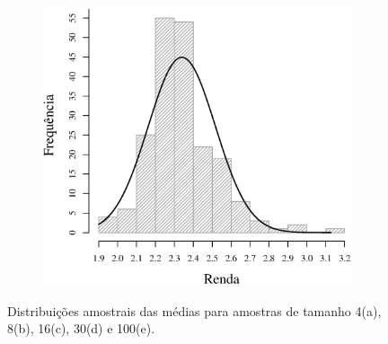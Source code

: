 \begin{figure}
\begin{subfigure}[b]{0.48\textwidth}
		\caption{}
		\label{fig:m30}
	\end{subfigure}
	\\
	\begin{subfigure}[b]{0.48\textwidth}
		\includegraphics[width=\textwidth]{plots/histogram_renda_n100.eps}
		\caption{}
		\label{fig:m100}
	\end{subfigure}
	\caption{Distribuições amostrais das médias para amostras de tamanho 4(a), 8(b), 16(c), 30(d) e 100(e).}
	\label{fig:distribuicao-amostral}
\end{figure}

\FloatBarrier

